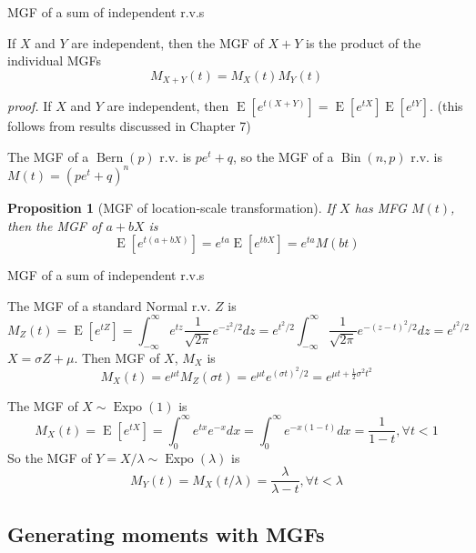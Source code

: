 \documentclass[8pt]{beamer}
\newtheorem{proposition}[theorem]{Proposition}
\newcommand{\ti}[1]{\textit{#1}}
\newcommand{\myber}[1]{\operatorname{Bern}\!\left(#1\right)}
\newcommand{\mybin}[2]{\operatorname{Bin}\!\left(#1,#2\right)}
\newcommand{\myexpo}[1]{\operatorname{Expo}\!\left(#1\right)}
\newcommand{\expec}[1]{\operatorname{E}\left[ #1 \right]}
\begin{document}
\begin{frame}{MGF of a sum of independent r.v.s}
    \begin{theorem}
        If $X$ and $Y$ are independent, then the MGF of $X + Y$ is the product of the individual MGFs
        \[
        M_{X+Y} (t) = M_X (t) M_Y (t)
        \]
    \end{theorem}
    \ti{proof.} If $X$ and $Y$ are independent, then $\expec{e^{t (X+Y)}} = \expec{e^{tX}} \expec{e^{tY}}$. (this follows from results discussed in Chapter 7)

    \begin{example}
        The MGF of a $\myber{p}$ r.v. is $pe^t +q$, so the MGF of a $\mybin{n}{p}$ r.v. is $M(t) = (pe^t + q)^n$
    \end{example}

    \begin{proposition}[MGF of location-scale transformation]
        If $X$ has MFG $M(t)$, then the MGF of $a + bX$ is 
        \[
            \expec{e^{t(a+bX)}} = e^{ta}\expec{e^{tbX}} = e^{ta}M(bt)
        \]
    \end{proposition}
\end{frame}

\begin{frame}{MGF of a sum of independent r.v.s}
    \begin{example}
        The MGF of a standard Normal r.v. $Z$ is 
        \[
        M_Z(t) = \expec{e^{tZ}} = \int_{-\infty}^\infty e^{tz} \frac{1}{\sqrt{2\pi}} e^{-z^2/2} dz = e^{t^2 /2} \int_{-\infty}^\infty \frac{1}{\sqrt{2\pi}} e^{-(z - t)^2 / 2}dz = e^{t^2/ 2}
        \]
        $X = \sigma Z + \mu$. Then MGF of $X$, $M_X$ is 
        \[
        M_X(t) = e^{\mu t} M_Z(\sigma t) = e^{\mu t} e^{(\sigma t)^2/2} = e^{\mu t + \frac{1}{2} \sigma^2 t^2} 
        \]
    \end{example}

    \begin{example}
        The MGF of $X \sim \myexpo{1}$ is
        \[
            M_X(t) = \expec{e^{tX}} = \int_{0}^\infty e^{tx} e^{-x} dx = \int_{0}^\infty e^{-x(1 -t)} dx = \frac{1}{1 - t}, \forall t < 1
        \]
        So the MGF of $Y = X /\lambda \sim \myexpo{\lambda}$ is
        \[
        M_Y (t) = M_X(t / \lambda) = \frac{\lambda}{\lambda - t}, \forall t <\lambda
        \]
    \end{example}
\end{frame}

\subsection{Generating moments with MGFs}
\end{document}

